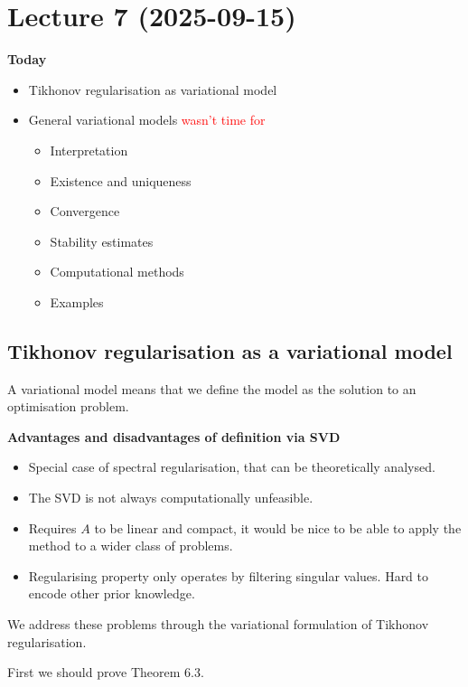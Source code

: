 \documentclass[12pt]{article}
\begin{document}
\section{Lecture 7 (2025-09-15)}
\textbf{Today}
\begin{itemize}
    \item Tikhonov regularisation as variational model
    \item General variational models \textcolor{red}{wasn't time for}
    \begin{itemize}
        \item Interpretation
        \item Existence and uniqueness
        \item Convergence
        \item Stability estimates
        \item Computational methods
        \item Examples
    \end{itemize}
\end{itemize}

\subsection{Tikhonov regularisation as a variational model}
A variational model means that we define the model as the solution to an optimisation problem.

\textbf{Advantages and disadvantages of definition via SVD}

\begin{itemize}[label=($\boldsymbol{+}$)]
    \item Special case of spectral regularisation, that can be theoretically analysed.
\end{itemize}
\begin{itemize}[label=$(\boldsymbol{-})$]
    \item The SVD is not always computationally unfeasible.
    \item Requires $A$ to be linear and compact, it would be nice to be able to apply the method to a wider class of problems.
    \item Regularising property only operates by filtering singular values. Hard to encode other prior knowledge.
\end{itemize}

We address these problems through the variational formulation of Tikhonov regularisation.

First we should prove Theorem 6.3.
\end{document}
